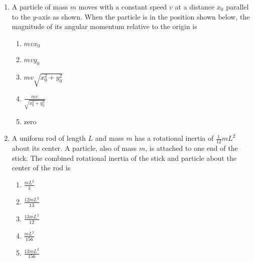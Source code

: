 \documentclass{../../../oss-classkick}
\begin{document}
\begin{multicols*}{2}
\begin{enumerate}[leftmargin=18pt]
  \item A particle of mass $m$ moves with a constant speed $v$ at a distance
    $x_0$ parallel to the $y$-axis as shown. When the particle is in the
    position shown below, the magnitude of its angular momentum relative to the
    origin is
    \begin{center}
    \end{center}
    \begin{enumerate}[itemsep=4pt,topsep=0pt,leftmargin=18pt,label=(\Alph*)]
    \item $mvx_0$
    \item $mvy_0$
    \item $mv\sqrt{x_0^2+y_0^2}$
    \item $\displaystyle\frac{mv}{\sqrt{x_0^2+y_0^2}}$
    \item zero
    \end{enumerate}
    \columnbreak
    
  \item A uniform rod of length $L$ and mass $m$ has a rotational inertia of
    $\displaystyle \frac1{12}mL^2$ about its center. A particle, also of mass
    $m$, is attached to one end of the stick. The combined rotational inertia of
    the stick and particle about the center of the rod is
     \begin{center}
    \end{center}
    \begin{enumerate}[itemsep=4pt,topsep=0pt,leftmargin=18pt,label=(\Alph*)]
    \item$\displaystyle\frac{mL^2}{3}$
    \item$\displaystyle\frac{12mL^2}{13}$
    \item$\displaystyle\frac{13mL^2}{12}$
    \item$\displaystyle\frac{mL^2}{156}$
    \item$\displaystyle\frac{13mL^2}{156}$
    \end{enumerate}


\end{enumerate}
\end{multicols*}
\end{document}
